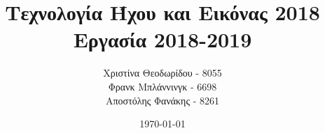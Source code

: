 \documentclass[11pt]{article}
\title{Τεχνολογία Ήχου και Εικόνας 2018\\
    Εργασία 2018-2019}
\author{Χριστίνα Θεοδωρίδου - 8055\\
    Φρανκ Μπλάννινγκ - 6698\\
    Αποστόλης Φανάκης - 8261}
\date{\today}
\begin{document}
    \maketitle
    \tableofcontents
    \newpage

    
    
    
    

    
    {}
\end{document}
